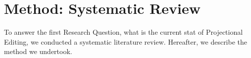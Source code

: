 \chapter{Method: Systematic Review}\label{chapter:Method_systematic_review}

To answer the first Research Question, what is the current stat of Projectional Editing, we conducted a systematic literature review.
Hereafter, we describe the method we undertook.


